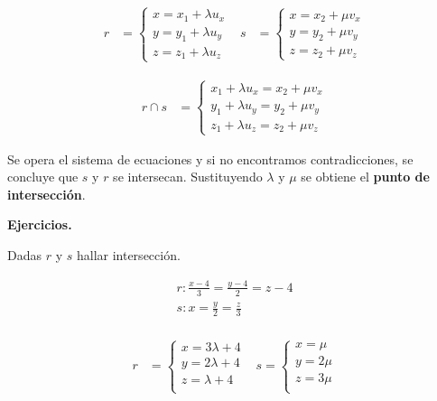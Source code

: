 \documentclass{article}
\begin{document}
\begin{align*}
    r                        & =
    \begin{cases}
        x = x_1 + \lambda u_x \\
        y = y_1 + \lambda u_y \\
        z = z_1 + \lambda u_z
    \end{cases} &
    s                        & =
    \begin{cases}
        x = x_2 + \mu v_x \\
        y = y_2 + \mu v_y \\
        z = z_2 + \mu v_z
    \end{cases}
\end{align*}

\begin{align*}
    r \cap s & =
    \begin{cases}
        x_1 + \lambda u_x = x_2 + \mu v_x \\
        y_1 + \lambda u_y = y_2 + \mu v_y \\
        z_1 + \lambda u_z = z_2 + \mu v_z
    \end{cases}
\end{align*}

Se opera el sistema de ecuaciones y si no encontramos contradicciones,
se concluye que $s$ y $r$ se intersecan.
Sustituyendo $\lambda$ y $\mu$ se obtiene el \textbf{punto de intersección}.

\textbf{Ejercicios.}

Dadas \(r\) y \(s\) hallar intersección.

\begin{align*}
    r: \frac{x-4}{3} = \frac{y-4}{2} = z - 4 \\
    s: x = \frac{y}{2} = \frac{z}{3}         \\
\end{align*}

\begin{align*}
    r                    & =
    \begin{cases}
        x = 3 \lambda + 4 \\
        y = 2 \lambda + 4 \\
        z = \lambda + 4   \\
    \end{cases} &
    s =
    \begin{cases}
        x = \mu   \\
        y = 2 \mu \\
        z = 3 \mu \\
    \end{cases}             \\
\end{align*}
\end{document}
